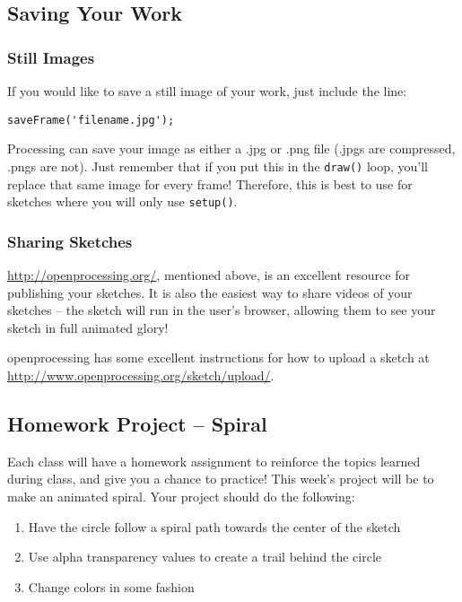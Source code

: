 \subsection{Saving Your Work}
\subsubsection{Still Images}
If you would like to save a still image of your work, just include the line:

\begin{verbatim}
saveFrame('filename.jpg');
\end{verbatim}

Processing can save your image as either a .jpg or .png file (.jpgs are compressed, .pngs are not).  Just remember that if you put this in the \texttt{draw()} loop, you'll replace that same image for every frame!  Therefore, this is best to use for sketches where you will only use \texttt{setup()}.

\subsubsection{Sharing Sketches}
\url{http://openprocessing.org/}, mentioned above, is an excellent resource for publishing your sketches.  It is also the easiest way to share videos of your sketches -- the sketch will run in the user's browser, allowing them to see your sketch in full animated glory!

openprocessing has some excellent instructions for how to upload a sketch at \url{http://www.openprocessing.org/sketch/upload/}.

\subsection{Homework Project -- Spiral}
Each class will have a homework assignment to reinforce the topics learned during class, and give you a chance to practice!  This week's project will be to make an animated spiral.  Your project should do the following:

\begin{enumerate}
\item Have the circle follow a spiral path towards the center of the sketch
\item Use alpha transparency values to create a trail behind the circle
\item Change colors in some fashion
\end{enumerate}

